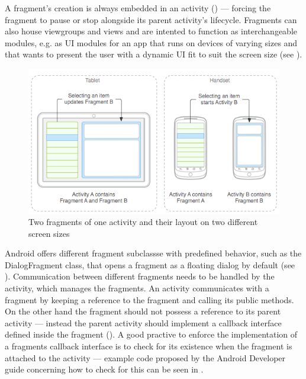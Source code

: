 A fragment's creation is always embedded in an activity (\cite{androidfragment}) --- forcing the fragment to pause or stop alongside its parent activity's lifecycle. Fragments can also house viewgroups and views and are intented to function as interchangeable modules, e.g. as \gls{UI} modules for an app that runs on devices of varying sizes and that wants to present the user with a dynamic \gls{UI} fit to suit the screen size (see ).

\begin{figure}
    \includegraphics[width=1.0\linewidth]{images/fragments.png}
   	\caption[Two fragments of one activity and their layout on two different screen sizes. \protect{}]{Two fragments of one activity and their layout on two different screen sizes} 
   	\label{fig:fragments_uimodules} 
\end{figure}

Android offers different fragment subclassse with predefined behavior, such as the DialogFragment class, that opens a fragment as a floating dialog by default (see ).  Communication between different fragments needs to be handled by the activity, which manages the fragments. An activity communicates with a fragment by keeping a reference to the fragment and calling its public methods. On the other hand the fragment should not possess a reference to its parent activity --- instead the parent activity should implement a callback interface defined inside the fragment (\cite{fragment_event_callback}). A good practive to enforce the implementation of a fragments callback interface is to check for its existence when the fragment is attached to the activity --- example code proposed by the Android Developer guide concerning how to check for this can be seen in  \cite{fragment_event_callback}.

